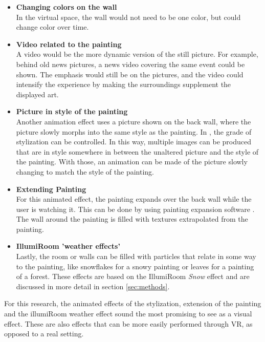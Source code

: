 \documentclass[a4paper]{article}
\begin{document}
\begin{itemize}

\item{\textbf{Changing colors on the wall}}
\\In the virtual space, the wall would not need to be one color, but could change color over time.

\item{\textbf{Video related to the painting}}
\\A video would be the more dynamic version of the still picture. For example, behind old news pictures, a news video covering the same event could be shown. The emphasis would still be on the pictures, and the video could intensify the experience by making the surroundings supplement the displayed art.

\item{\textbf{Picture in style of the painting}}
\\Another animation effect uses a picture shown on the back wall, where the picture slowly morphs into the same style as the painting. In \cite{gatys}, the grade of stylization can be controlled. In this way, multiple images can be produced that are in style somewhere in between the unaltered picture and the style of the painting. With those, an animation can be made of the picture slowly changing to match the style of the painting.

\item{\textbf{Extending Painting}}
\\For this animated effect, the painting expands over the back wall while the user is watching it. This can be done by using painting expansion software \cite{inpainting}. The wall around the painting is filled with textures extrapolated from the painting.


\item{\textbf{IllumiRoom 'weather effects'}}
\\Lastly, the room or walls can be filled with particles that relate in some way to the painting, like snowflakes for a snowy painting or leaves for a painting of a forest. These effects are based on the IllumiRoom \emph{Snow} effect \cite{illumiroom} and are discussed in more detail in section \ref{sec:methods}.
\end{itemize}

For this research, the animated effects of the stylization, extension of the painting and the illumiRoom weather effect sound the most promising to see as a visual effect. These are also effects that can be more easily performed through VR, as opposed to a real setting.
\end{document}
